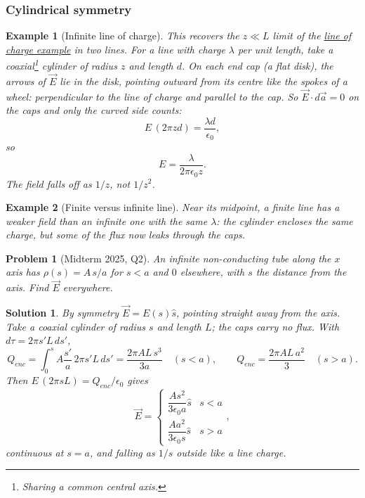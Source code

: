 \documentclass{article}
\newtheorem{problem}{Problem}
\newtheorem{solution}{Solution}
\newtheorem*{example}{Example}
\begin{document}
\subsubsection{Cylindrical symmetry}
\begin{example}[Infinite line of charge]
    This recovers the $z \ll L$ limit of the \hyperref[ex:line-charge]{line of charge example} in two lines. For a line with charge $\lambda$ per unit length, take a coaxial\footnote{Sharing a common central axis.} cylinder of radius $z$ and length $d$. On each end cap (a flat disk), the arrows of $\vec{E}$ lie in the disk, pointing outward from its centre like the spokes of a wheel: perpendicular to the line of charge and parallel to the cap. So $\vec{E}\cdot d\vec{a} = 0$ on the caps and only the curved side counts:
    \[E\,(2\pi z d) = \frac{\lambda d}{\epsilon_0},\]
    so
    \begin{equation}
        E = \frac{\lambda}{2\pi\epsilon_0 z}.
    \end{equation}
    The field falls off as $1/z$, not $1/z^2$.
\end{example}
\begin{example}[Finite versus infinite line]
    Near its midpoint, a finite line has a weaker field than an infinite one with the same $\lambda$: the cylinder encloses the same charge, but some of the flux now leaks through the caps.
\end{example}
\begin{problem}[Midterm 2025, Q2]
    An infinite non-conducting tube along the $x$ axis has $\rho(s) = A\,s/a$ for $s < a$ and $0$ elsewhere, with $s$ the distance from the axis. Find $\vec{E}$ everywhere.
\end{problem}
\begin{solution}
    By symmetry $\vec{E} = E(s)\hat{s}$, pointing straight away from the axis. Take a coaxial cylinder of radius $s$ and length $L$; the caps carry no flux. With $d\tau = 2\pi s'L\,ds'$,
    \[Q_{enc} = \int_0^{s}A\frac{s'}{a}\,2\pi s'L\,ds' = \frac{2\pi AL\,s^3}{3a}\quad(s<a), \qquad Q_{enc} = \frac{2\pi AL\,a^2}{3}\quad(s>a).\]
    Then $E\,(2\pi sL) = Q_{enc}/\epsilon_0$ gives
    \[\vec{E} = \begin{cases}\dfrac{A s^2}{3\epsilon_0 a}\hat{s} & s < a\\[8pt] \dfrac{A a^2}{3\epsilon_0 s}\hat{s} & s > a\end{cases},\]
    continuous at $s = a$, and falling as $1/s$ outside like a line charge.
\end{solution}
\end{document}
